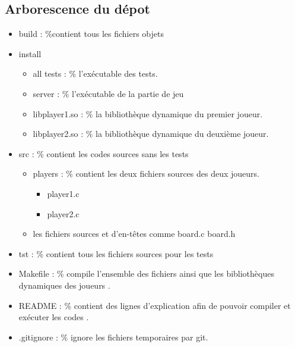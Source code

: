 \documentclass[10pt]{article}
\begin{document}
\subsection{Arborescence du dépot}
\begin{itemize}
    \item build :    \%contient tous les fichiers objets
    \item install
    \begin{itemize}
        \item all tests : \% l'exécutable des tests.
        \item server    : \% l'exécutable de la partie de jeu
        \item libplayer1.so : \% la bibliothèque dynamique du premier joueur.
        \item libplayer2.so : \% la bibliothèque dynamique du deuxième joueur.      
    \end{itemize}
    \item src : \% contient les codes sources sans les tests
    \begin{itemize}
        \item players : \% contient les deux fichiers sources des deux joueurs.
        \begin{itemize}
            \item player1.c 
            \item player2.c
        \end{itemize}
        \item les fichiers sources et d'en-têtes comme board.c board.h
    \end{itemize}
    \item tst : \% contient tous les fichiers sources pour les tests
    \item Makefile : \% compile l'ensemble des fichiers ainsi que les bibliothèques dynamiques des joueurs .
    \item README : \% contient des lignes d'explication afin de pouvoir compiler et exécuter les codes .
    \item .gitignore :  \% ignore les fichiers temporaires par git.
\end{itemize}
\end{document}

